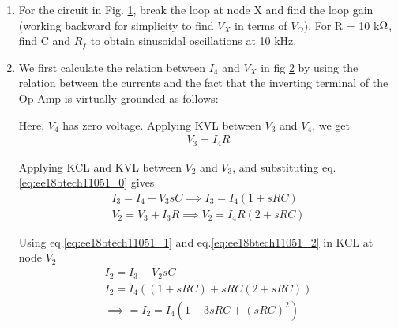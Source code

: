 \begin{enumerate}[label=\arabic*.,ref=\theenumi]

\item

For the circuit in Fig. \ref{fig:ee18btech11051_fig1}, break the loop at node X and find the loop gain (working backward for simplicity to find $V_{X}$ in terms of $V_{O}$). For R = 10 k$\ohm$, find C and $R_{f}$ to obtain sinusoidal oscillations at 10 kHz.

\begin{figure}[!ht]
	\begin{center}
		\resizebox{\columnwidth}{!}{}
	\end{center}
\caption{}
\label{fig:ee18btech11051_fig1}
\end{figure}

\item
\solution
We first calculate the relation between $I_{4}$ and $V_{X}$ in fig \ref{fig:ee18btech11051_fig2} by using the relation between the currents and the fact that the inverting terminal of the Op-Amp is virtually grounded as follows:
\begin{figure}[!ht]
	\begin{center}
		\resizebox{\columnwidth}{!}{}
	\end{center}
\caption{}
\label{fig:ee18btech11051_fig2}
\end{figure}

Here, $V_{4}$ has zero voltage. Applying KVL between $V_{3}$ and $V_{4}$, we get
\begin{align}
    V_{3} = I_{4}R \label{eq:ee18btech11051_0}
\end{align}

Applying KCL and KVL between $V_{2}$ and $V_{3}$, and substituting eq.\ref{eq:ee18btech11051_0} gives
\begin{align}
    I_{3} = I_{4} + V_{3}sC \implies I_{3} = I_{4}(1+sRC) \label{eq:ee18btech11051_1}\\
    V_{2} = V_{3} + I_{3}R
    \implies V_{2} = I_{4}R(2+sRC) \label{eq:ee18btech11051_2}
\end{align}

Using eq.\ref{eq:ee18btech11051_1} and eq.\ref{eq:ee18btech11051_2} in KCL at node $V_{2}$ 
\begin{align}
    I_{2} = I_{3} + V_{2}sC\\
    I_{2} = I_{4}((1+sRC) + sRC(2+sRC))\\
    \implies = I_{2} = I_{4}(1+3sRC+(sRC)^{2}) \label{eq:ee18btech11051_3}
\end{align}


\end{enumerate}
